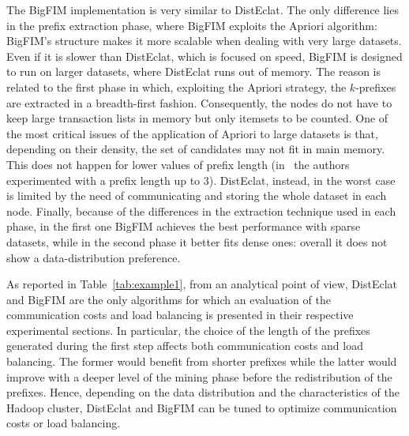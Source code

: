 The BigFIM implementation is very similar to DistEclat. The only difference lies
in the prefix extraction phase, where BigFIM exploits the Apriori algorithm:
BigFIM’s structure makes it more scalable when dealing with very large datasets.
Even if it is slower than DistEclat, which is focused on speed, BigFIM is
designed to run on larger datasets, where DistEclat runs out of memory.
The reason is related to the first phase in which, exploiting the Apriori strategy,
the $k$-prefixes are extracted in a breadth-first fashion. Consequently, the nodes
do not have to keep large transaction lists in memory but only itemsets to be
counted.
One of the most critical issues of the application of Apriori to large
datasets is that, depending on their density,
the set of candidates may not fit in main memory.
This does not happen for lower values of prefix length
(in~\cite{bigfim} the authors experimented with a prefix length up to 3).
DistEclat, instead, in the worst case is limited by the need of communicating
and storing the whole dataset in each node.
Finally, because of the differences in the extraction technique used in
each phase, in the first one BigFIM achieves the best performance with sparse
datasets, while in the second phase it better fits dense ones: overall it does
not show a data-distribution preference.

As reported in Table~\ref{tab:example1}, from an analytical point of view,
DistEclat and BigFIM are the only algorithms for which an evaluation of the
communication costs and load balancing is presented in their respective
experimental sections. In particular, the choice of the length of the prefixes
generated during the first step affects both communication costs and load
balancing. The former would benefit from shorter prefixes while the latter would
improve with a deeper level of the mining phase before the redistribution of the
prefixes.
Hence, depending on the data distribution and the characteristics of the
Hadoop cluster, DistEclat and BigFIM can be tuned to optimize communication
costs or load balancing.


